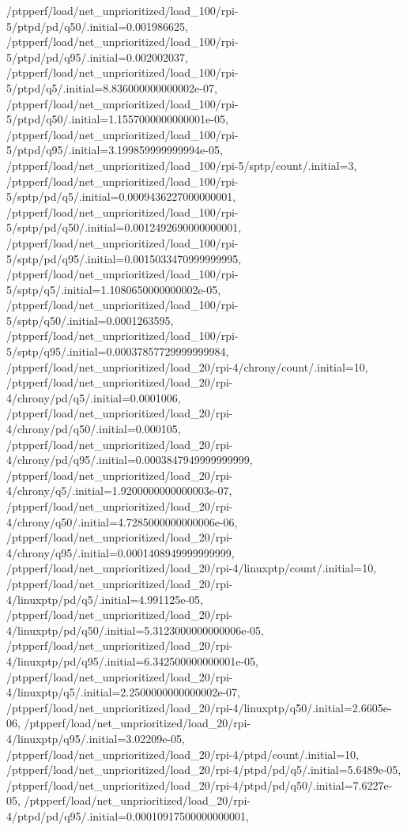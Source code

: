 {    /ptpperf/load/net_unprioritized/load_100/rpi-5/ptpd/pd/q50/.initial=0.001986625,
    /ptpperf/load/net_unprioritized/load_100/rpi-5/ptpd/pd/q95/.initial=0.002002037,
    /ptpperf/load/net_unprioritized/load_100/rpi-5/ptpd/q5/.initial=8.836000000000002e-07,
    /ptpperf/load/net_unprioritized/load_100/rpi-5/ptpd/q50/.initial=1.1557000000000001e-05,
    /ptpperf/load/net_unprioritized/load_100/rpi-5/ptpd/q95/.initial=3.199859999999994e-05,
    /ptpperf/load/net_unprioritized/load_100/rpi-5/sptp/count/.initial=3,
    /ptpperf/load/net_unprioritized/load_100/rpi-5/sptp/pd/q5/.initial=0.0009436227000000001,
    /ptpperf/load/net_unprioritized/load_100/rpi-5/sptp/pd/q50/.initial=0.0012492690000000001,
    /ptpperf/load/net_unprioritized/load_100/rpi-5/sptp/pd/q95/.initial=0.0015033470999999995,
    /ptpperf/load/net_unprioritized/load_100/rpi-5/sptp/q5/.initial=1.1080650000000002e-05,
    /ptpperf/load/net_unprioritized/load_100/rpi-5/sptp/q50/.initial=0.0001263595,
    /ptpperf/load/net_unprioritized/load_100/rpi-5/sptp/q95/.initial=0.00037857729999999984,
    /ptpperf/load/net_unprioritized/load_20/rpi-4/chrony/count/.initial=10,
    /ptpperf/load/net_unprioritized/load_20/rpi-4/chrony/pd/q5/.initial=0.0001006,
    /ptpperf/load/net_unprioritized/load_20/rpi-4/chrony/pd/q50/.initial=0.000105,
    /ptpperf/load/net_unprioritized/load_20/rpi-4/chrony/pd/q95/.initial=0.0003847949999999999,
    /ptpperf/load/net_unprioritized/load_20/rpi-4/chrony/q5/.initial=1.9200000000000003e-07,
    /ptpperf/load/net_unprioritized/load_20/rpi-4/chrony/q50/.initial=4.7285000000000006e-06,
    /ptpperf/load/net_unprioritized/load_20/rpi-4/chrony/q95/.initial=0.0001408949999999999,
    /ptpperf/load/net_unprioritized/load_20/rpi-4/linuxptp/count/.initial=10,
    /ptpperf/load/net_unprioritized/load_20/rpi-4/linuxptp/pd/q5/.initial=4.991125e-05,
    /ptpperf/load/net_unprioritized/load_20/rpi-4/linuxptp/pd/q50/.initial=5.3123000000000006e-05,
    /ptpperf/load/net_unprioritized/load_20/rpi-4/linuxptp/pd/q95/.initial=6.342500000000001e-05,
    /ptpperf/load/net_unprioritized/load_20/rpi-4/linuxptp/q5/.initial=2.2500000000000002e-07,
    /ptpperf/load/net_unprioritized/load_20/rpi-4/linuxptp/q50/.initial=2.6605e-06,
    /ptpperf/load/net_unprioritized/load_20/rpi-4/linuxptp/q95/.initial=3.02209e-05,
    /ptpperf/load/net_unprioritized/load_20/rpi-4/ptpd/count/.initial=10,
    /ptpperf/load/net_unprioritized/load_20/rpi-4/ptpd/pd/q5/.initial=5.6489e-05,
    /ptpperf/load/net_unprioritized/load_20/rpi-4/ptpd/pd/q50/.initial=7.6227e-05,
    /ptpperf/load/net_unprioritized/load_20/rpi-4/ptpd/pd/q95/.initial=0.00010917500000000001,
}
